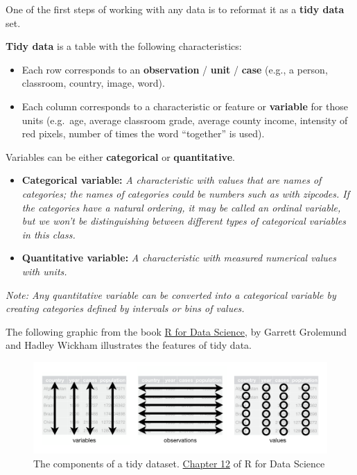 \documentclass[
]{book}
\providecommand{\tightlist}{%
  \setlength{\itemsep}{0pt}\setlength{\parskip}{0pt}}
\begin{document}
One of the first steps of working with any data is to reformat it as a \textbf{tidy data} set.

\textbf{Tidy data} is a table with the following characteristics:

\begin{itemize}
\tightlist
\item
  Each row corresponds to an \textbf{observation} / \textbf{unit} / \textbf{case} (e.g., a person, classroom, country, image, word).
\item
  Each column corresponds to a characteristic or feature or \textbf{variable} for those units (e.g.~age, average classroom grade, average county income, intensity of red pixels, number of times the word ``together'' is used).
\end{itemize}

Variables can be either \textbf{categorical} or \textbf{quantitative}.

\begin{itemize}
\item
  \textbf{Categorical variable:} \emph{A characteristic with values that are names of categories; the names of categories could be numbers such as with zipcodes. If the categories have a natural ordering, it may be called an ordinal variable, but we won't be distinguishing between different types of categorical variables in this class.}
\item
  \textbf{Quantitative variable:} \emph{A characteristic with measured numerical values with units.}
\end{itemize}

\emph{Note: Any quantitative variable can be converted into a categorical variable by creating categories defined by intervals or bins of values.}

The following graphic from the book \href{http://r4ds.had.co.nz/}{R for Data Science}, by Garrett Grolemund and Hadley Wickham illustrates the features of tidy data.

\begin{figure}
\centering
\includegraphics{Photos/tidy.png}
\caption{The components of a tidy dataset. \href{http://r4ds.had.co.nz/tidy-data.html}{Chapter 12} of R for Data Science}
\end{figure}
\end{document}
